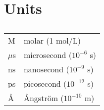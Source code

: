 \section{Units}
\begin{table}[H]
\caption*{}
\centering
\addtolength{\tabcolsep}{7pt} 
\begin{tabular}{ll}
\hline
M & molar (1 mol/L)
\\
$\mu$s & microsecond ($10^{-6}$ s)
\\
ns & nanosecond ($10^{-9}$ s)
\\
ps & picosecond ($10^{-12}$ s)
\\
Å & Ångström ($10^{-10}$ m)
\\
\hline
\end{tabular}
\addtolength{\tabcolsep}{7pt} 
\label{tab:units}
\end{table}